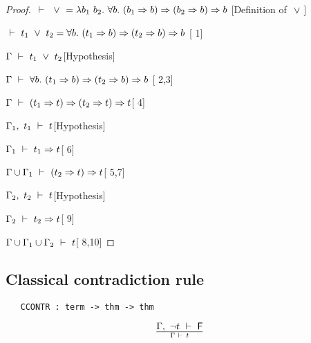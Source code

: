 \begin{proof}
\item $\ \vdash\  \ \vee\  =
\lambda b_1\ b_2.\ \forall b.\ (b_1\Rightarrow b)\Rightarrow(b_2\Rightarrow b)\Rightarrow b$
\hfill [Definition of $\ \vee\ $]
\item $\ \vdash\  t_1\ \vee\  t_2 = \forall b.\ (t_1\Rightarrow b)\Rightarrow(t_2\Rightarrow b)\Rightarrow b$
\hfill [ 1]
\item $\Gamma\ \vdash\  t_1\ \vee\  t_2$\hfill [Hypothesis]
\item $\Gamma\ \vdash\ \forall b.\ (t_1\Rightarrow b)\Rightarrow(t_2\Rightarrow b)\Rightarrow b$\hfill
[ 2,3]
\item $\Gamma\ \vdash\ (t_1\Rightarrow t)\Rightarrow(t_2\Rightarrow t)\Rightarrow t$\hfill [ 4]
\item $\Gamma_1,\ t_1\ \vdash\  t$\hfill [Hypothesis]
\item $\Gamma_1\ \vdash\  t_1\Rightarrow t$\hfill [ 6]
\item $\Gamma\cup \Gamma_1\ \vdash\  (t_2\Rightarrow t)\Rightarrow t$\hfill [ 5,7]
\item $\Gamma_2,\ t_2\ \vdash\  t$\hfill [Hypothesis]
\item $\Gamma_2\ \vdash\  t_2\Rightarrow t$\hfill [ 9]
\item $\Gamma\cup \Gamma_1\cup \Gamma_2\ \vdash\  t$\hfill [ 8,10]
\end{proof}




\subsection{Classical contradiction rule}

\begin{holboxed}
\begin{verbatim}
   CCONTR : term -> thm -> thm
\end{verbatim}\end{holboxed}

\vspace{12pt plus2pt minus1pt}

$$\Gamma,\ \neg t\ \vdash\  {\sf F}\over \Gamma\ \vdash\  t$$

\vspace{12pt plus2pt minus1pt}

